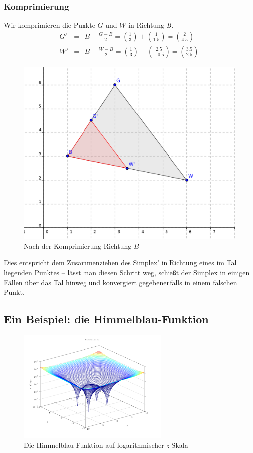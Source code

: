 \documentclass[naustrian]{article}
\begin{document}
{\subsubsection{Komprimierung}

Wir komprimieren die Punkte $G$ und $W$ in Richtung $B$.
\begin{eqnarray*}
    G' & = & B+\frac{G-B}{2}=\binom{1}{3}+\binom{1}{1.5}=\binom{2}{4.5}\\
    W' & = & B+\frac{W-B}{2}=\binom{1}{3}+\binom{2.5}{-0.5}=\binom{3.5}{2.5}
\end{eqnarray*}

\begin{figure}[H]
    \centering
    \includegraphics[width=.65\textwidth]{nelder_mead/triangle_compress}
    \caption{Nach der Komprimierung Richtung $B$}
\end{figure}

Dies entspricht dem Zusammenziehen des Simplex' in Richtung eines im Tal
liegenden Punktes -- lässt man diesen Schritt weg, schießt der Simplex
in einigen Fällen über das Tal hinweg und konvergiert gegebenenfalls
in einem falschen Punkt.

\subsection{Ein Beispiel: die Himmelblau-Funktion}

\begin{figure}[H]
    \centering
    \includegraphics[width=0.65\textwidth]{nelder_mead/himmelblau}
    \caption{Die Himmelblau Funktion auf logarithmischer $z$-Skala}
\end{figure}

}
\end{document}
